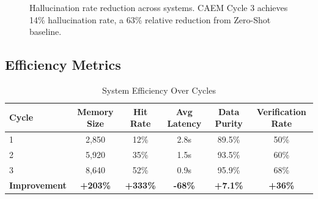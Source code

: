 \documentclass[12pt,a4paper]{article}
\theoremstyle{definition}
\begin{document}
\begin{figure}[htbp]
\caption{Hallucination rate reduction across systems. CAEM Cycle 3 achieves 14\% hallucination rate, a 63\% relative reduction from Zero-Shot baseline.}
\label{fig:hallucination}
\end{figure}

\subsection{Efficiency Metrics}

\begin{table}[htbp]
\centering
\caption{System Efficiency Over Cycles}
\begin{tabular}{lccccc}
\toprule
\textbf{Cycle} & \textbf{Memory Size} & \textbf{Hit Rate} & \textbf{Avg Latency} & \textbf{Data Purity} & \textbf{Verification Rate} \\
\midrule
1 & 2,850 & 12\% & 2.8s & 89.5\% & 50\% \\
2 & 5,920 & 35\% & 1.5s & 93.5\% & 60\% \\
3 & 8,640 & 52\% & 0.9s & 95.9\% & 68\% \\
\midrule
\textbf{Improvement} & \textbf{+203\%} & \textbf{+333\%} & \textbf{-68\%} & \textbf{+7.1\%} & \textbf{+36\%} \\
\bottomrule
\end{tabular}
\end{table}
\end{document}
